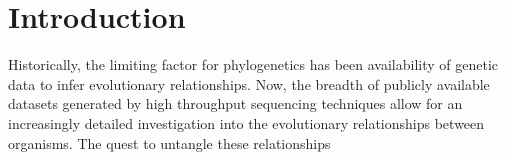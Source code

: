 \documentclass[12pt]{article}
\begin{document}
\section{Introduction}
Historically, %
the limiting factor for phylogenetics has been availability of genetic data to infer evolutionary relationships.
Now, the breadth of publicly available datasets generated by high throughput sequencing techniques allow for an increasingly detailed investigation into the evolutionary relationships between organisms.
The quest to untangle these relationships
\end{document}

